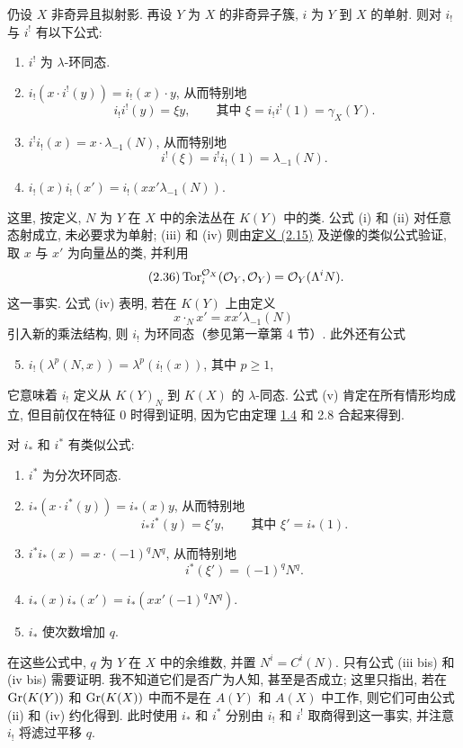 仍设 $X$ 非奇异且拟射影. 再设 $Y$ 为 $X$ 的非奇异子簇, $i$ 为 $Y$ 到 $X$ 的单射. 则对 $i_!$ 与 $i^!$ 有以下公式:
\begin{enumerate}[label=(\roman*)]
\item $i^!$ 为 $\lambda$-环同态.
\item $i_!(x\cdot i^!(y))=i_!(x)\cdot y$, 从而特别地
\[
 i_!i^!(y)=\xi y,
\qquad \text{其中 }\xi=i_!i^!(1)=\gamma_X(Y).
\]
\item $i^!i_!(x)=x\cdot\lambda_{-1}(N)$, 从而特别地
\[
 i^!(\xi)=i^!i_!(1)=\lambda_{-1}(N).
\]
\item $i_!(x)i_!(x')=i_!(xx'\lambda_{-1}(N))$.
\end{enumerate}
这里, 按定义, $N$ 为 $Y$ 在 $X$ 中的余法丛在 $K(Y)$ 中的类. 公式 (i) 和 (ii) 对任意态射成立, 未必要求为单射; (iii) 和 (iv) 则由\hyperlink{sga6.e00.eq.2-15}{定义 (2.15)} 及逆像的类似公式验证, 取 $x$ 与 $x'$ 为向量丛的类, 并利用
\begin{equation}\tag{2.36}
 \operatorname{Tor}_i^{\mathcal O_X}(\mathcal O_Y,\mathcal O_Y)=\mathcal O_Y(\Lambda^i N).
\end{equation}
这一事实. 公式 (iv) 表明, 若在 $K(Y)$ 上由定义
\[
 x\cdot_N x'=xx'\lambda_{-1}(N)
\]
引入新的乘法结构, 则 $i_!$ 为环同态（参见第一章第 4 节）. 此外还有公式
\begin{enumerate}[label=(\roman*)]
\setcounter{enumi}{4}
\item $i_!(\lambda^p(N,x))=\lambda^p(i_!(x))$, 其中 $p\geq 1$,
\end{enumerate}
它意味着 $i_!$ 定义从 $K(Y)_N$ 到 $K(X)$ 的 $\lambda$-同态. 公式 (v) 肯定在所有情形均成立, 但目前仅在特征 $0$ 时得到证明, 因为它由定理 \hyperlink{sga6.e00.thm.1-4}{1.4} 和 2.8 合起来得到.

对 $i_*$ 和 $i^*$ 有类似公式:
\begin{enumerate}[label=(\roman* bis)]
\item $i^*$ 为分次环同态.
\item $i_*(x\cdot i^*(y))=i_*(x)y$, 从而特别地
\[
 i_*i^*(y)=\xi' y,
\qquad \text{其中 }\xi'=i_*(1).
\]
\item $i^*i_*(x)=x\cdot (-1)^qN^q$, 从而特别地
\[
 i^*(\xi')=(-1)^qN^q.
\]
\item $i_*(x)i_*(x')=i_*(xx'(-1)^qN^q)$.
\item $i_*$ 使次数增加 $q$.
\end{enumerate}
在这些公式中, $q$ 为 $Y$ 在 $X$ 中的余维数, 并置 $N^i=C^i(N)$. 只有公式 (iii bis) 和 (iv bis) 需要证明. 我不知道它们是否广为人知, 甚至是否成立; 这里只指出, 若在 $\operatorname{Gr}(K(Y))$ 和 $\operatorname{Gr}(K(X))$ 中而不是在 $A(Y)$ 和 $A(X)$ 中工作, 则它们可由公式 (ii) 和 (iv) 约化得到. 此时使用 $i_*$ 和 $i^*$ 分别由 $i_!$ 和 $i^!$ 取商得到这一事实, 并注意 $i_!$ 将滤过平移 $q$.

